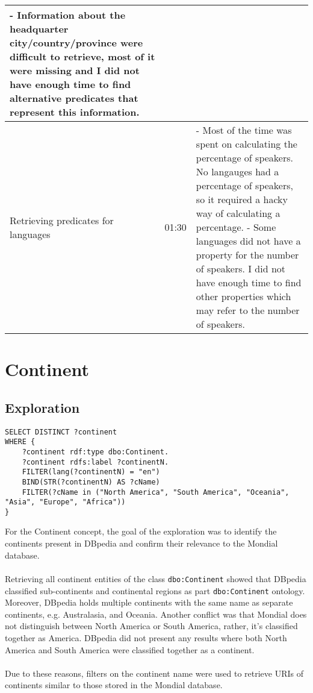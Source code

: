 \documentclass[11pt]{article}
\begin{document}
\begin{longtable}{|p{3.9cm}|p{4.05cm}|p{6.8cm}|}
        - Information about the headquarter city/country/province were difficult to retrieve, most of it were missing and I did not have enough time to find alternative predicates that represent this information.
    \\
    \hline
    Retrieving predicates for languages & 01:30 & 
        - Most of the time was spent on calculating the percentage of speakers. No langauges had a percentage of speakers, so it required a hacky way of calculating a percentage. \newline
        - Some languages did not have a property for the number of speakers. I did not have enough time to find other properties which may refer to the number of speakers.
    \\
    \hline
\end{longtable}

\section{Continent}
\subsection{Exploration}
{\footnotesize\begin{verbatim}
SELECT DISTINCT ?continent
WHERE {
    ?continent rdf:type dbo:Continent.
    ?continent rdfs:label ?continentN.
    FILTER(lang(?continentN) = "en")
    BIND(STR(?continentN) AS ?cName)
    FILTER(?cName in ("North America", "South America", "Oceania", "Asia", "Europe", "Africa"))
}
\end{verbatim}}

For the Continent concept, the goal of the exploration was to identify the continents present in DBpedia and confirm their relevance to the Mondial database.
\\ \\
Retrieving all continent entities of the class \texttt{dbo:Continent} showed that DBpedia classified sub-continents and continental regions as part
\texttt{dbo:Continent} ontology.
Moreover, DBpedia holds multiple continents with the same name as separate continents, e.g. Australasia, and Oceania. Another conflict
was that Mondial does not distinguish between North America or South America, rather, it's classified together as America. DBpedia did not present any results
where both North America and South America were classified together as a continent.
\\ \\
Due to these reasons, filters on the continent name were used to retrieve URIs of continents similar to those stored in the Mondial database.
\end{document}

